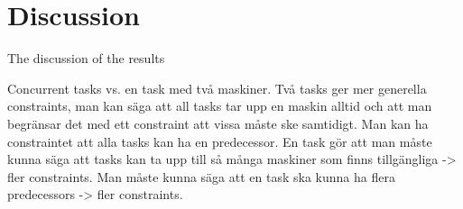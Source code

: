 \chapter{Discussion}\label{cha:discuss}
The discussion of the results

Concurrent tasks vs. en task med två maskiner.
Två tasks ger mer generella constraints, man kan säga att all tasks tar upp en maskin alltid och att man begränsar det med ett constraint att vissa måste ske samtidigt. Man kan ha constraintet att alla tasks kan ha en predecessor.
En task gör att man måste kunna säga att tasks kan ta upp till så många maskiner som finns tillgängliga -> fler constraints. Man måste kunna säga att en task ska kunna ha flera predecessors -> fler constraints.

